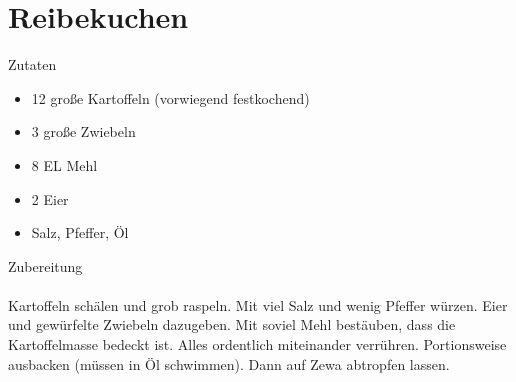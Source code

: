 \section*{Reibekuchen}
\ihead{}\ohead{}
\cfoot{}
{\Large Zutaten}
\begin{multicols}{2}
\begin{itemize}
    \item \num{12} große Kartoffeln (vorwiegend festkochend)
    \item \num{3} große Zwiebeln
    \item \num{8} EL Mehl
    \item \num{2} Eier
    \item Salz, Pfeffer, Öl
\end{itemize}
\end{multicols}
\noindent
{\Large Zubereitung}\\
\\
Kartoffeln schälen und grob raspeln. 
Mit viel Salz und wenig Pfeffer würzen.
Eier und gewürfelte Zwiebeln dazugeben. 
Mit soviel Mehl bestäuben, dass die Kartoffelmasse bedeckt ist.
Alles ordentlich miteinander verrühren.
Portionsweise ausbacken (müssen in Öl schwimmen).
Dann auf Zewa abtropfen lassen.
